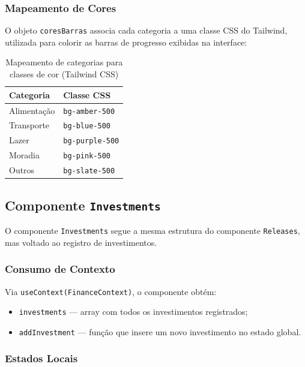 \documentclass{article}
\begin{document}
\subsubsection*{Mapeamento de Cores}

O objeto \texttt{coresBarras} associa cada categoria a uma classe CSS do Tailwind, utilizada para colorir as barras de progresso exibidas na interface:

\begin{table}[h]
\centering
\begin{tabular}{ll}
\hline
\textbf{Categoria} & \textbf{Classe CSS} \\
\hline
Alimentação & \texttt{bg-amber-500} \\
Transporte  & \texttt{bg-blue-500} \\
Lazer       & \texttt{bg-purple-500} \\
Moradia     & \texttt{bg-pink-500} \\
Outros      & \texttt{bg-slate-500} \\
\hline
\end{tabular}
\caption{Mapeamento de categorias para classes de cor (Tailwind CSS)}
\end{table}

\subsection{Componente \texttt{Investments}}

O componente \texttt{Investments} segue a mesma estrutura do componente \texttt{Releases}, mas voltado ao registro de investimentos.

\subsubsection*{Consumo de Contexto}

Via \texttt{useContext(FinanceContext)}, o componente obtém:

\begin{itemize}
  \item \texttt{investments} — array com todos os investimentos registrados;
  \item \texttt{addInvestment} — função que insere um novo investimento no estado global.
\end{itemize}

\subsubsection*{Estados Locais}
\end{document}
